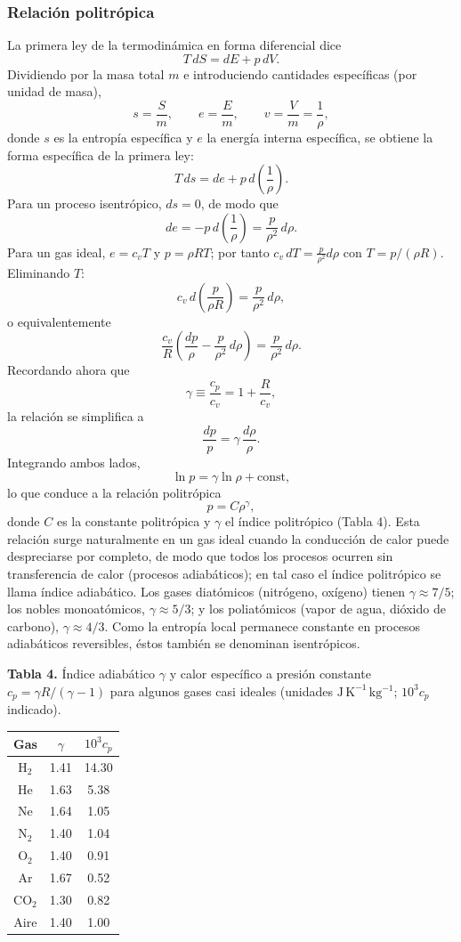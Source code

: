 \subsubsection*{Relación politrópica}
La primera ley de la termodinámica en forma diferencial dice
$$ T\,dS = dE + p\,dV. $$
Dividiendo por la masa total $m$ e introduciendo cantidades específicas (por unidad de masa),
$$ s = \frac{S}{m}, \qquad e = \frac{E}{m}, \qquad v = \frac{V}{m} = \frac{1}{\rho}, $$
donde $s$ es la entropía específica y $e$ la energía interna específica, se obtiene la forma específica de la primera ley:
$$ T\,ds = de + p\,d\!\left(\frac{1}{\rho}\right). $$
Para un proceso isentrópico, $ds = 0$, de modo que
$$ de = -p\,d\!\left(\frac{1}{\rho}\right) = \frac{p}{\rho^2}\,d\rho. $$
Para un gas ideal, $e = c_v T$ y $p = \rho R T$; por tanto $c_v\,dT = \frac{p}{\rho^2}d\rho$ con $T = p/(\rho R)$. Eliminando $T$:
$$ c_v\, d\!\left(\frac{p}{\rho R}\right) = \frac{p}{\rho^2}\,d\rho, $$
o equivalentemente
$$ \frac{c_v}{R}\left(\frac{dp}{\rho} - \frac{p}{\rho^2}\,d\rho\right) = \frac{p}{\rho^2}\,d\rho. $$
Recordando ahora que
$$ \gamma \equiv \frac{c_p}{c_v} = 1 + \frac{R}{c_v}, $$
la relación se simplifica a
$$ \frac{dp}{p} = \gamma\,\frac{d\rho}{\rho}. $$
Integrando ambos lados,
$$ \ln p = \gamma \ln \rho + \mathrm{const}, $$
lo que conduce a la relación politrópica
$$ p = C\rho^{\gamma}, $$
donde $C$ es la constante politrópica y $\gamma$ el índice politrópico (Tabla 4). Esta relación surge naturalmente en un gas ideal cuando la conducción de calor puede despreciarse por completo, de modo que todos los procesos ocurren sin transferencia de calor (procesos adiabáticos); en tal caso el índice politrópico se llama índice adiabático. Los gases diatómicos (nitrógeno, oxígeno) tienen $\gamma \approx 7/5$; los nobles monoatómicos, $\gamma \approx 5/3$; y los poliatómicos (vapor de agua, dióxido de carbono), $\gamma \approx 4/3$. Como la entropía local permanece constante en procesos adiabáticos reversibles, éstos también se denominan isentrópicos.

\begin{center}
\textbf{Tabla 4.} Índice adiabático $\gamma$ y calor específico a presión constante $c_p = \gamma R/(\gamma - 1)$ para algunos gases casi ideales (unidades $\mathrm{J\,K^{-1}\,kg^{-1}}$; $10^{3}c_p$ indicado).
\begin{tabular}{ccc}
\hline
Gas & $\gamma$ & $10^{3}c_p$ \\
\hline
H$_2$ & 1.41 & 14.30 \\
He & 1.63 & 5.38 \\
Ne & 1.64 & 1.05 \\
N$_2$ & 1.40 & 1.04 \\
O$_2$ & 1.40 & 0.91 \\
Ar & 1.67 & 0.52 \\
CO$_2$ & 1.30 & 0.82 \\
Aire & 1.40 & 1.00 \\
\hline
\end{tabular}
\end{center}

